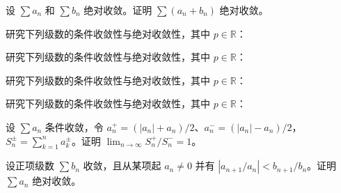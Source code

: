 \newpage
\noindent\begin{minipage}{\textwidth}
设 $\sum a_n$ 和 $\sum b_n$ 绝对收敛。证明 $\sum(a_n+b_n)$ 绝对收敛。
\end{minipage}\par\vfill
\noindent\begin{minipage}{\textwidth}
研究下列级数的条件收敛性与绝对收敛性，其中 $p\in\mathbb R$：
\end{minipage}\par\vfill
\noindent\begin{minipage}{\textwidth}
研究下列级数的条件收敛性与绝对收敛性，其中 $p\in\mathbb R$：
\end{minipage}\par\vfill
\noindent\begin{minipage}{\textwidth}
研究下列级数的条件收敛性与绝对收敛性，其中 $p\in\mathbb R$：
\end{minipage}\par\vfill
\newpage
\noindent\begin{minipage}{\textwidth}
研究下列级数的条件收敛性与绝对收敛性，其中 $p\in\mathbb R$：
\end{minipage}\par\vfill
\noindent\begin{minipage}{\textwidth}
设 $\sum a_n$ 条件收敛，令 $a_n^+=(|a_n|+a_n)/2$、$a_n^-=(|a_n|-a_n)/2$，$S_n^\pm=\sum_{k=1}^n a_k^\pm$。证明 $\lim_{n\to\infty}S_n^+/S_n^-=1$。
\end{minipage}\par\vfill
\noindent\begin{minipage}{\textwidth}
设正项级数 $\sum b_n$ 收敛，且从某项起 $a_n\ne0$ 并有 $|a_{n+1}/a_n|<b_{n+1}/b_n$。证明 $\sum a_n$ 绝对收敛。
\end{minipage}\par\vfill
